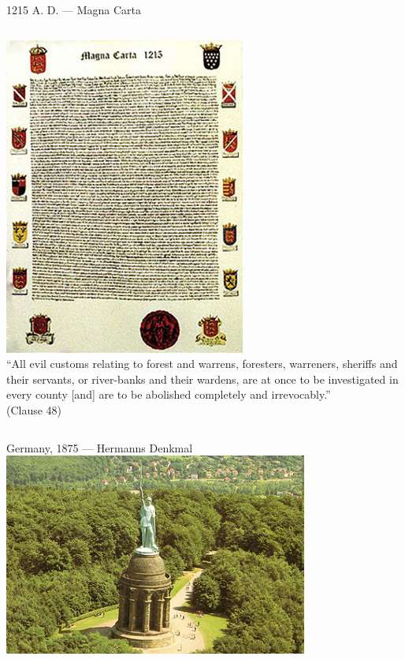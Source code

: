 \documentclass{beamer}
\begin{document}
\begin{frame}{1215 A. D. --- Magna Carta}
    \begin{columns}[onlytextwidth]
            \centering
            \includegraphics[height=0.55\textheight]{img/magna-carta.png} \\

            ``All evil customs relating to forest and warrens, foresters, warreners, sheriffs and their servants, or river-banks and their wardens, are at once to be investigated in every county  [and] are to be abolished completely and irrevocably.'' \\
            (Clause 48)
    \end{columns}
\end{frame}

\begin{frame}{Germany, 1875 --- Hermanns Denkmal}
    \centering
    \includegraphics[width=0.75\textwidth]{img/hermans-denkmal.png} \\
\end{frame}
\end{document}
